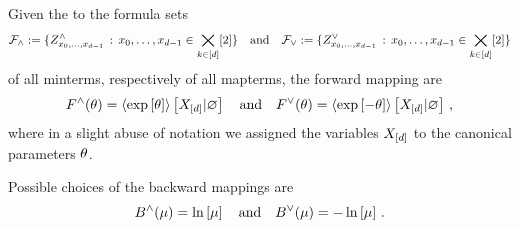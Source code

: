 \begin{theorem}
    Given the \MarkovLogicNetworks{} to the formula sets
    \[ \mathcal{F}_{\land} := \{ Z^{\land}_{{x_{0},\ldots,x_{d-1}}} \, : \, {x_{0},\ldots,x_{d-1}}\in\bigtimes_{k\in[d]}[2]\} \quad \text{and} \quad
    \mathcal{F}_{\lor} := \{ Z^{\lor}_{{x_{0},\ldots,x_{d-1}}} \, : \, {x_{0},\ldots,x_{d-1}}\in\bigtimes_{k\in[d]}[2]\}  \]
    of all minterms, respectively of all mapterms, the forward mapping are
    \[ F^{\land}(\theta) = \left\langle \mathrm{exp}\left[\theta\right]\right\rangle \left[ X_{[d]} | \varnothing \right]
    \quad \text{and} \quad
    F^{\lor}(\theta) = \left\langle \mathrm{exp}\left[-\theta\right]\right\rangle \left[ X_{[d]} | \varnothing \right] \, , \]
    where in a slight abuse of notation we assigned the variables $X_{[d]}$ to the canonical parameters $\theta$.

    Possible choices of the backward mappings are
    \[ B^{\land}(\mu) = \ln \left[ \mu \right]
    \quad \text{and} \quad
    B^{\lor}(\mu) = -\ln \left[ \mu \right] \, .
    \]
\end{theorem}
